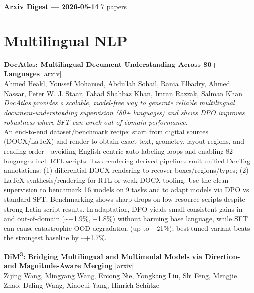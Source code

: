 \documentclass[12pt,letterpaper]{article}
\begin{document}
{\footnotesize\textbf{Arxiv Digest --- 2026-05-14} \hfill 7 papers}

\smallskip

\section*{Multilingual NLP}

{\small\textbf{DocAtlas: Multilingual Document Understanding Across 80+ Languages}} {\scriptsize[\href{https://arxiv.org/abs/2605.12623}{arxiv}]}\\
{\scriptsize Ahmed Heakl, Youssef Mohamed, Abdullah Sohail, Rania Elbadry, Ahmed Nassar, Peter W. J. Staar, Fahad Shahbaz Khan, Imran Razzak, Salman Khan}\\

{\small\textit{DocAtlas provides a scalable, model-free way to generate reliable multilingual document-understanding supervision (80+ languages) and shows DPO improves robustness where SFT can wreck out-of-domain performance.}}\\[1pt]
{\footnotesize An end-to-end dataset/benchmark recipe: start from digital sources (DOCX/LaTeX) and render to obtain exact text, geometry, layout regions, and reading order---avoiding English-centric auto-labeling loops and enabling 82 languages incl. RTL scripts. Two rendering-derived pipelines emit unified DocTag annotations: (1) differential DOCX rendering to recover boxes/regions/types; (2) LaTeX synthesis/rendering for RTL or weak DOCX tooling. Use the clean supervision to benchmark 16 models on 9 tasks and to adapt models via DPO vs standard SFT. Benchmarking shows sharp drops on low-resource scripts despite strong Latin-script results. In adaptation, DPO yields small consistent gains in- and out-of-domain (\textasciitilde{}+1.9\%, +1.8\%) without harming base language, while SFT can cause catastrophic OOD degradation (up to −21\%); best tuned variant beats the strongest baseline by \textasciitilde{}+1.7\%.}

\medskip

{\small\textbf{DiM\textsuperscript{3}: Bridging Multilingual and Multimodal Models via Direction- and Magnitude-Aware Merging}} {\scriptsize[\href{https://arxiv.org/abs/2605.12960}{arxiv}]}\\
{\scriptsize Zijing Wang, Mingyang Wang, Ercong Nie, Yongkang Liu, Shi Feng, Mengjie Zhao, Daling Wang, Xiaocui Yang, Hinrich Sch\"utze}\\
\end{document}
